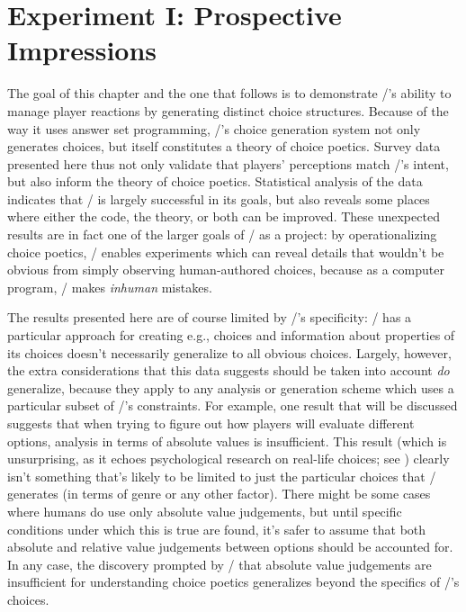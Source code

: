 \chapter{Experiment I: Prospective Impressions}

\label{ch:option-results}


The goal of this chapter and the one that follows is to demonstrate \dunyazad/'s ability to manage player reactions by generating distinct choice structures.
%
Because of the way it uses answer set programming, \dunyazad/'s choice generation system not only generates choices, but itself constitutes a theory of choice poetics.
%
Survey data presented here thus not only validate that players' perceptions match \dunyazad/'s intent, but also inform the theory of choice poetics.
%
Statistical analysis of the data indicates that \dunyazad/ is largely successful in its goals, but also reveals some places where either the code, the theory, or both can be improved. 
%
These unexpected results are in fact one of the larger goals of \dunyazad/ as a project: by operationalizing choice poetics, \dunyazad/ enables experiments which can reveal details that wouldn't be obvious from simply observing human-authored choices, because as a computer program, \dunyazad/ makes \emph{inhuman} mistakes.


The results presented here are of course limited by \dunyazad/'s specificity: \dunyazad/ has a particular approach for creating e.g.,  choices and information about properties of its  choices doesn't necessarily generalize to all obvious choices.
%
Largely, however, the extra considerations that this data suggests should be taken into account \emph{do} generalize, because they apply to any analysis or generation scheme which uses a particular subset of \dunyazad/'s constraints.
%
For example, one result that will be discussed suggests that when trying to figure out how players will evaluate different options, analysis in terms of absolute values is insufficient.
%
This result (which is unsurprising, as it echoes psychological research on real-life choices; see \citep{Schwartz2002}) clearly isn't something that's likely to be limited to just the particular choices that \dunyazad/ generates (in terms of genre or any other factor).
%
There might be some cases where humans do use only absolute value judgements, but until specific conditions under which this is true are found, it's safer to assume that both absolute and relative value judgements between options should be accounted for.
%
In any case, the discovery prompted by \dunyazad/ that absolute value judgements are insufficient for understanding choice poetics generalizes beyond the specifics of \dunyazad/'s choices.


